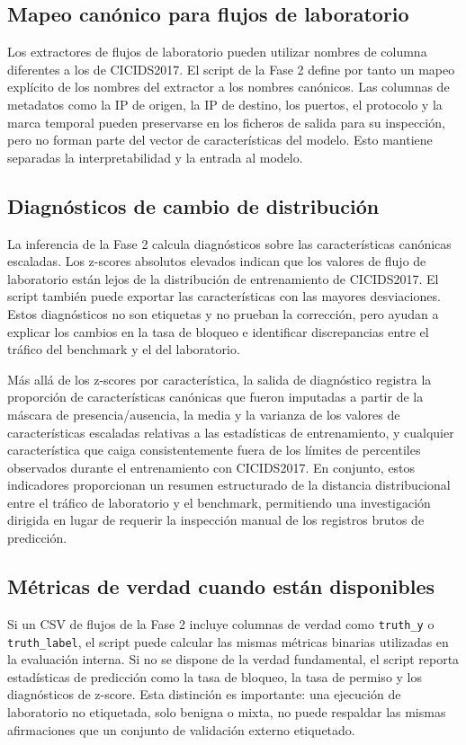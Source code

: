 \subsection{Mapeo canónico para flujos de laboratorio}
Los extractores de flujos de laboratorio pueden utilizar nombres de columna diferentes a los de CICIDS2017. El script de la Fase 2 define por tanto un mapeo explícito de los nombres del extractor a los nombres canónicos. Las columnas de metadatos como la IP de origen, la IP de destino, los puertos, el protocolo y la marca temporal pueden preservarse en los ficheros de salida para su inspección, pero no forman parte del vector de características del modelo. Esto mantiene separadas la interpretabilidad y la entrada al modelo.

\subsection{Diagnósticos de cambio de distribución}
La inferencia de la Fase 2 calcula diagnósticos sobre las características canónicas escaladas. Los z-scores absolutos elevados indican que los valores de flujo de laboratorio están lejos de la distribución de entrenamiento de CICIDS2017. El script también puede exportar las características con las mayores desviaciones. Estos diagnósticos no son etiquetas y no prueban la corrección, pero ayudan a explicar los cambios en la tasa de bloqueo e identificar discrepancias entre el tráfico del benchmark y el del laboratorio.

Más allá de los z-scores por característica, la salida de diagnóstico registra la proporción de características canónicas que fueron imputadas a partir de la máscara de presencia/ausencia, la media y la varianza de los valores de características escaladas relativas a las estadísticas de entrenamiento, y cualquier característica que caiga consistentemente fuera de los límites de percentiles observados durante el entrenamiento con CICIDS2017. En conjunto, estos indicadores proporcionan un resumen estructurado de la distancia distribucional entre el tráfico de laboratorio y el benchmark, permitiendo una investigación dirigida en lugar de requerir la inspección manual de los registros brutos de predicción.

\subsection{Métricas de verdad cuando están disponibles}
Si un CSV de flujos de la Fase 2 incluye columnas de verdad como \texttt{truth\_y} o \texttt{truth\_label}, el script puede calcular las mismas métricas binarias utilizadas en la evaluación interna. Si no se dispone de la verdad fundamental, el script reporta estadísticas de predicción como la tasa de bloqueo, la tasa de permiso y los diagnósticos de z-score. Esta distinción es importante: una ejecución de laboratorio no etiquetada, solo benigna o mixta, no puede respaldar las mismas afirmaciones que un conjunto de validación externo etiquetado.

